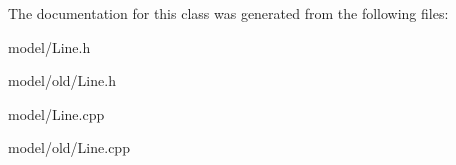 The documentation for this class was generated from the following files\-:\begin{DoxyCompactItemize}
\item 
model/Line.\-h\item 
model/old/Line.\-h\item 
model/Line.\-cpp\item 
model/old/Line.\-cpp\end{DoxyCompactItemize}
